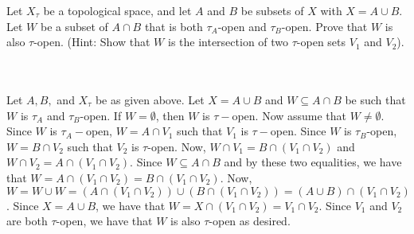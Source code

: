 Let $X_{\tau}$ be a topological space, and let $A$ and $B$ be subsets of $X$ with $X=A\cup B$. Let $W$
be a subset of $A\cap B$ that is both $\tau_A$-open and $\tau_B$-open. Prove that $W$ is also
$\tau$-open. (Hint: Show that $W$ is the intersection of two $\tau$-open sets $V_1$ and $V_2$).\\\\

\begin{solution}\renewcommand{\qedsymbol}{}\ \\
    Let $A, B,$ and $X_{\tau}$ be as given above. Let $X=A\cup B$ and $W\subseteq A\cap B$ be such that
    $W$ is $\tau_A$ and $\tau_B$-open. If $W=\emptyset$, then $W$ is $\tau-$open. Now assume that
    $W\neq\emptyset$. Since $W$ is $\tau_A-$open, $W=A\cap V_1$ such that $V_1$ is $\tau-$open. Since
    $W$ is $\tau_B$-open, $W=B\cap V_2$ such that $V_2$ is $\tau$-open. Now,
    $W\cap V_1=B\cap(V_1\cap V_2)$ and $W\cap V_2=A\cap(V_1\cap V_2)$. Since $W\subseteq A\cap B$ and
    by these two equalities, we have that $W=A\cap(V_1\cap V_2)=B\cap(V_1\cap V_2)$. Now,
    $W=W\cup W=(A\cap(V_1\cap V_2))\cup (B\cap(V_1\cap V_2))=(A\cup B)\cap(V_1\cap V_2)$. Since
    $X=A\cup B$, we have that $W=X\cap(V_1\cap V_2)=V_1\cap V_2$. Since $V_1$ and $V_2$ are both
    $\tau$-open, we have that $W$ is also $\tau$-open as desired.

\end{solution}